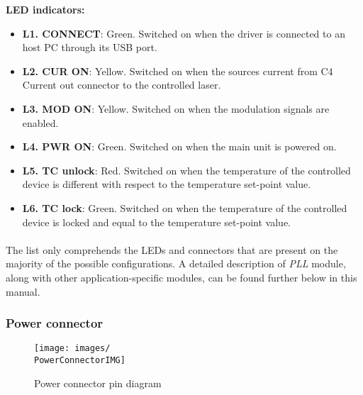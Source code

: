 \textbf{LED indicators:}
\begin{itemize}
    \item \textbf{L1. CONNECT}: Green. Switched on when the \QubeModel  driver is connected to an host PC through its USB port.
    \item \textbf{L2. CUR ON}: Yellow. Switched on when the \QubeModel  sources current from C4 Current out connector to the controlled laser.
    \item \textbf{L3. MOD ON}: Yellow. Switched on when the modulation signals are enabled.
    \item \textbf{L4. PWR ON}: Green. Switched on when the \QubeModel  main unit is powered on.
    \item \textbf{L5. TC unlock}: Red. Switched on when the temperature of the controlled device is different with respect to the temperature set-point value.
    \item \textbf{L6. TC lock}: Green. Switched on when the temperature of the controlled device is locked and equal to the temperature set-point value.
\end{itemize}

\paragraph{} The list only comprehends the LEDs and connectors that are present on the majority of the \QubeModel  possible configurations. A detailed description of \textit{PLL} module, along with other application-specific modules, can be found further below in this manual.





\subsubsection{Power connector}    \label{cpt:power_connector}
\begin{wrapfigure}{r}{0.58\textwidth}
    \texttt{[image: images/\\PowerConnectorIMG]}
    \caption{Power connector pin diagram}
    \label{fig:power_connector}
\end{wrapfigure}
